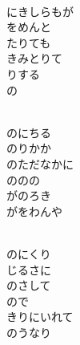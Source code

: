 \documentclass[10pt,b5j]{tarticle} %
\begin{document}
\vspace{1.5em} %
\newcommand{\linespace}{0.5em} %
\newcommand{\blocksize}{0.5\hsize} %
\newcommand{\itemmargin}{3em} %
\begin{enumerate} %
    \setlength{\itemindent}{\itemmargin} %
    \begin{minipage}[c]{\blocksize}
    
        \vspace{\linespace}
        \item~\\
        にきしらもが\\
        をめんと\\
        たりても\\
        きみとりて\\
        りする\\
        の
        
    \end{minipage}
    \begin{minipage}[c]{\blocksize}
        
        \vspace{\linespace}
        \item~\\
        のにちる\\
        のりかか\\
        のただなかに\\
        ののの\\
        がのろき\\
        がをわんや
        
    \end{minipage}
    \begin{minipage}[c]{\blocksize}
        
        \vspace{\linespace}
        \item~\\
        のにくり\\
        じるさに\\
        のさして\\
        ので\\
        きりにいれて\\
        のうなり
        

\end{minipage}
\end{enumerate}
\end{document}
